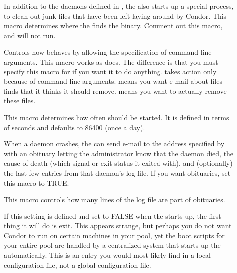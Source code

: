 \begin{description}
\item[] \label{param:Preen} In addition to the daemons
  defined in , the  also starts up
  a special process,  to clean out junk files that have
  been left laying around by Condor.  This macro determines where the
   finds the  binary.
  Comment out this macro, and  will not run.

\item[] \label{param:PreenArgs}
  Controls how  behaves by allowing the specification
  of command-line arguments.
  This macro works as  does.
  The difference is that you must specify this macro for
   if you want it to do anything.
   takes action only
  because of command line arguments.
   means you want e-mail about files  finds that it
  thinks it should remove.
   means you want  to actually remove these files.

\item[] \label{param:PreenInterval} This macro
  determines how often  should be started.  It is
  defined in terms of seconds and defaults to 86400 (once a day).

\item[] \label{param:PublishObituaries}
  When a daemon crashes, the  can send e-mail to the
  address specified by  with an obituary letting
  the administrator know that the daemon died, the cause of
  death (which signal or exit status it exited with), and
  (optionally) the last few entries from that daemon's log file.  If
  you want obituaries, set this macro to TRUE.

\item[] \label{param:ObituaryLogLength}
  This macro controls how many lines
  of the log file are part of obituaries.

\item[] \label{param:StartMaster} If this setting
  is defined and set to FALSE when the  starts up, the first
  thing it will do is exit.  This appears strange, but perhaps you
  do not want Condor to run on certain machines in your pool, yet
  the boot scripts for your entire pool are handled by a centralized
  system that starts up the  automatically.  This is
  an entry you would most likely find in a local configuration file,
  not a global configuration file.


\end{description}
